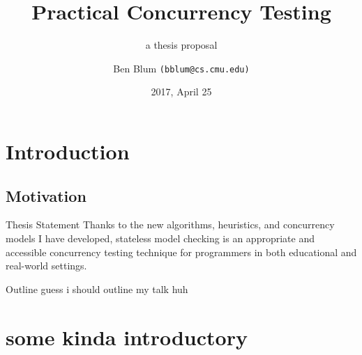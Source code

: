 \documentclass[xcolor=dvipsnames]{beamer}
\title[Thesis Proposal]{{\bf Practical Concurrency Testing}}
\subtitle[]{a thesis proposal}
\author[Ben Blum]{Ben Blum \texttt{(bblum@cs.cmu.edu)}}
\institute[CMU CSD]{Carnegie Mellon University}
\date[]{2017, April 25}
\begin{document}
\normalem
\begin{frame}
	\titlepage
\end{frame}


\newcommand\linegap{\vspace{0.2in}}
\newcommand\breakslide[1]{\begin{frame}{} \begin{center} #1 \end{center} \end{frame}}

\section{Introduction}
\subsection{Motivation}

\begin{frame}{Thesis Statement}
	Thanks to the new algorithms, heuristics, and concurrency models I have developed,
	stateless model checking is an appropriate and accessible concurrency testing technique
	for programmers in both educational and real-world settings.
\end{frame}

\begin{frame}{Outline}
	guess i should outline my talk huh
\end{frame}



\section{some kinda introductory}

\end{document}
